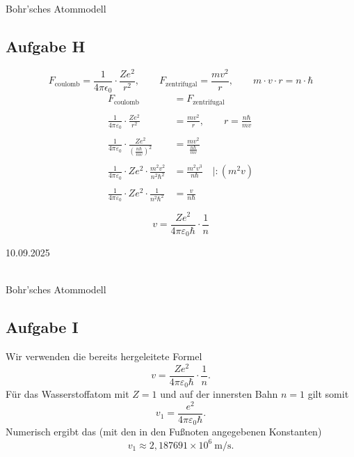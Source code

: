 \documentclass[11pt,a4paper,oneside]{article}
\newcommand{\lessondate}[1]{\noindent\hfill\textcolor{MarginalGray}{\textsc{#1}} \\ \vspace{0.5cm}}
\begin{document}
	\newpage
	
	\begin{loesung}{Bohr'sches Atommodell}
		\subsection*{Aufgabe H}
		\[
		F_\text{coulomb} = \frac{1}{4 \pi \epsilon_0} \cdot \frac{Ze^2}{r^2}, \qquad
		F_\text{zentrifugal} = \frac{mv^2}{r}, \qquad m\cdot v \cdot r = n \cdot \hbar 
		\]
		\begin{align*}
			F_\text{coulomb} &= F_\text{zentrifugal} \\\\
			\frac{1}{4 \pi \varepsilon_0} \cdot \frac{Ze^2}{r^2} &= \frac{m v^2}{r}, \qquad r = \frac{n \hbar}{m v} \\\\
			\frac{1}{4 \pi \varepsilon_0} \cdot \frac{Ze^2}{\left(\tfrac{n \hbar}{m v}\right)^2} &= \frac{m v^2}{\tfrac{n \hbar}{m v}} \\\\
			\frac{1}{4 \pi \varepsilon_0} \cdot Ze^2 \cdot \frac{m^2 v^2}{n^2 \hbar^2} &= \frac{m^2 v^3}{n \hbar} \quad | : (m^2 v) \\\\
			\frac{1}{4 \pi \varepsilon_0} \cdot Ze^2 \cdot \frac{1}{n^2 \hbar^2} &= \frac{v}{n \hbar} \\\\
		\end{align*}
		\vspace{-10mm}
		\[
		\boxed{v = \frac{Ze^2}{4 \pi \varepsilon_0 \hbar} \cdot \frac{1}{n}}
		\]
	\end{loesung}
	
	\lessondate{10.09.2025}\\
	\vspace{-15mm}
	\begin{loesung}{Bohr'sches Atommodell}
		\subsection*{Aufgabe I}
			Wir verwenden die bereits hergeleitete Formel
		\[
		v = \frac{Z e^2}{4\pi\varepsilon_0\hbar}\cdot\frac{1}{n}.
		\]
		Für das Wasserstoffatom mit \(Z=1\) und auf der innersten Bahn \(n=1\) gilt somit
		\[
		v_1 = \frac{e^2}{4\pi\varepsilon_0\hbar}.
		\]
		Numerisch ergibt das (mit den in den Fußnoten angegebenen Konstanten)
		\[
		\boxed{v_1 \approx 2{,}187691\times 10^{6}\ \mathrm{m/s}.}
		\]
	\end{loesung}
	
\end{document}
